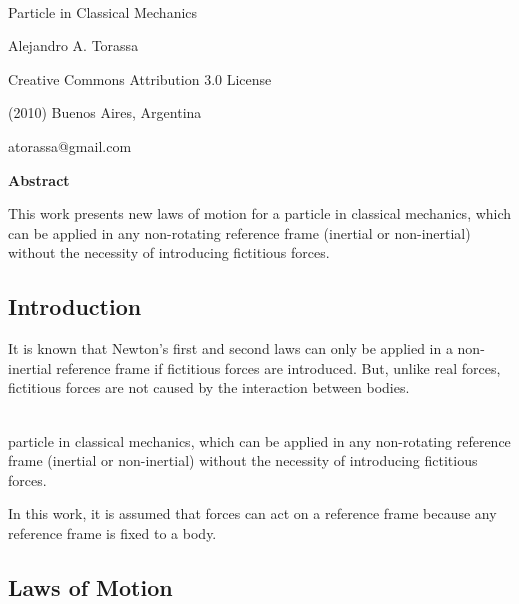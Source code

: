 \documentclass[12pt]{article}
\begin{document}
\begin{center}

{\Large {}\\ Particle in Classical Mechanics}

\bigskip \medskip

{\normalsize Alejandro A. Torassa}

\bigskip \medskip

\scriptsize

Creative Commons Attribution 3.0 License

(2010) Buenos Aires, Argentina

atorassa@gmail.com

\bigskip \medskip

\small

{\bf Abstract}

\bigskip

\parbox{81mm}{This work presents new laws of motion for a particle in classical mechanics, which can be applied in any non-rotating reference frame (inertial or non-inertial) without the necessity of introducing fictitious forces.}

\vspace{+0.03em}

\end{center}

\normalsize

{\centering\subsection*{Introduction}}

\par It is known that Newton's first and second laws can only be applied in a non-inertial reference frame if fictitious forces are introduced. But, unlike real forces, fictitious forces are not caused by the interaction between bodies.
\smallskip
\par {}\\ particle in classical mechanics, which can be applied in any non-rotating reference frame (inertial or non-inertial) without the necessity of introducing fictitious forces.
\smallskip
\par In this work, it is assumed that forces can act on a reference frame because any reference frame is fixed to a body.

\newpage

{\centering\subsection*{Laws of Motion}}
\end{document}
